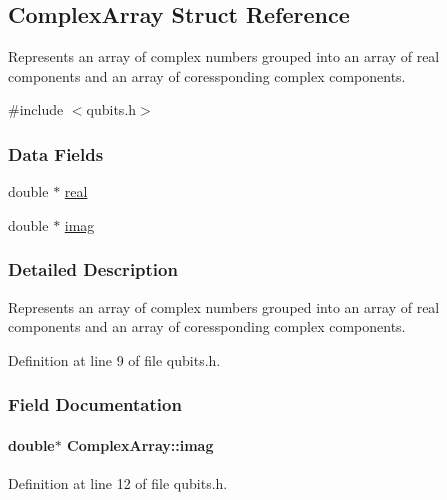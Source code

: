\hypertarget{structComplexArray}{}\subsection{Complex\+Array Struct Reference}
\label{structComplexArray}


Represents an array of complex numbers grouped into an array of real components and an array of coressponding complex components.  




{\ttfamily \#include $<$qubits.\+h$>$}

\subsubsection*{Data Fields}
\begin{DoxyCompactItemize}
\item 
double $\ast$ \hyperlink{structComplexArray_a1cf9fd31d6dce5ef618d2bcf3e4f8b69}{real}
\item 
double $\ast$ \hyperlink{structComplexArray_aa409fd14e1ff3e1fdcc53cc4eb77a7a8}{imag}
\end{DoxyCompactItemize}


\subsubsection{Detailed Description}
Represents an array of complex numbers grouped into an array of real components and an array of coressponding complex components. 

Definition at line 9 of file qubits.\+h.



\subsubsection{Field Documentation}
\paragraph[{\texorpdfstring{imag}{imag}}]{\setlength{\rightskip}{0pt plus 5cm}double$\ast$ Complex\+Array\+::imag}\hypertarget{structComplexArray_aa409fd14e1ff3e1fdcc53cc4eb77a7a8}{}\label{structComplexArray_aa409fd14e1ff3e1fdcc53cc4eb77a7a8}


Definition at line 12 of file qubits.\+h.



